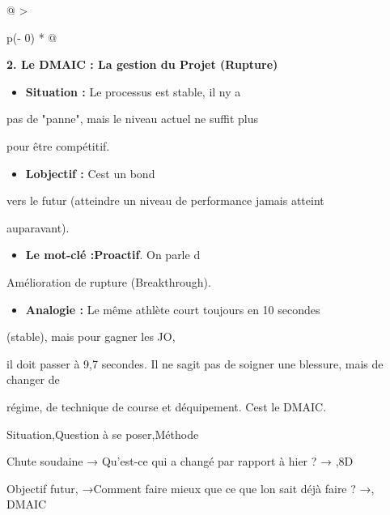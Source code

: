 \documentclass[
]{article}
\begin{document}
\begin{longtable}[]{@{}
  >{\raggedright\arraybackslash}p{(\columnwidth - 0\tabcolsep) * }@{}}
\begin{minipage}[b]{\linewidth}
\textbf{2. Le DMAIC : La gestion du Projet (Rupture)}

\begin{itemize}
\item \textbf{Situation :} Le processus est stable, il n\textquotesingle y a
\end{itemize}
pas de "panne", mais le niveau actuel ne suffit plus

pour être compétitif.

\begin{itemize}
\item \textbf{L\textquotesingle objectif :} C\textquotesingle est un bond
\end{itemize}
vers le futur (atteindre un niveau de performance jamais atteint

auparavant).

\begin{itemize}
\item \textbf{Le mot-clé :Proactif}. On parle d\textquotesingle{}
\end{itemize}
Amélioration de rupture (Breakthrough).

\begin{itemize}
\item \textbf{Analogie :} Le même athlète court toujours en 10 secondes
\end{itemize}
(stable), mais pour gagner les JO,

il doit passer à 9,7 secondes. Il ne s\textquotesingle agit pas de
soigner une blessure, mais de changer de

régime, de technique de course et d\textquotesingle équipement.
C\textquotesingle est le DMAIC.

Situation,Question à se poser,Méthode

Chute soudaine → Qu'est-ce qui a changé par rapport à hier ? → ,8D

Objectif futur, →Comment faire mieux que ce que l\textquotesingle on
sait déjà faire ? →, DMAIC
\end{minipage} \\
\midrule\noalign{}
\endhead
\bottomrule\noalign{}
\endlastfoot
\end{longtable}
\end{document}
